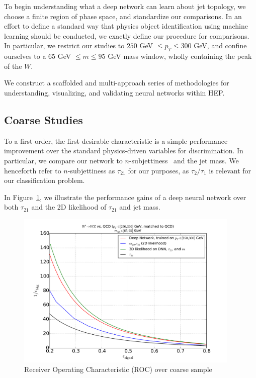 \documentclass{article}
\begin{document}
To begin understanding what a deep network can learn about jet topology, we choose a finite region of phase space, and standardize our comparisons. In an effort to define a standard way that physics object identification using machine learning should be conducted, we exactly define our procedure for comparisons. In particular, we restrict our studies to $250$ GeV $\leq p_T \leq 300$ GeV, and confine ourselves to a $65$ GeV $\leq m \leq 95$ GeV mass window, wholly containing the peak of the $W$. 

We construct a scaffolded and multi-approach series of methodologies for understanding, visualizing, and validating neural networks within HEP.

\subsection{Coarse Studies} %
\label{sub:coarse_studies}

To a first order, the first desirable characteristic is a simple performance improvement over the standard physics-driven variables for discrimination. In particular, we compare our network to $n$-subjettiness~\cite{nsub} and the jet mass. We henceforth refer to $n$-subjettiness as $\tau_{21}$ for our purposes, as $\tau_{2}/\tau_{1}$ is relevant for our classification problem.

In Figure~\ref{fig:combinedROC}, we illustrate the performance gains of a deep neural network over both $\tau_{21}$ and the 2D likelihood of $\tau_{21}$ and jet mass. 


\begin{figure}[!htbp]
  \centering
  \includegraphics[width=0.95\textwidth]{figures/combined-roc.pdf}
  \caption{Receiver Operating Characteristic (ROC) over coarse sample}
  \label{fig:combinedROC}
\end{figure}
\end{document}
